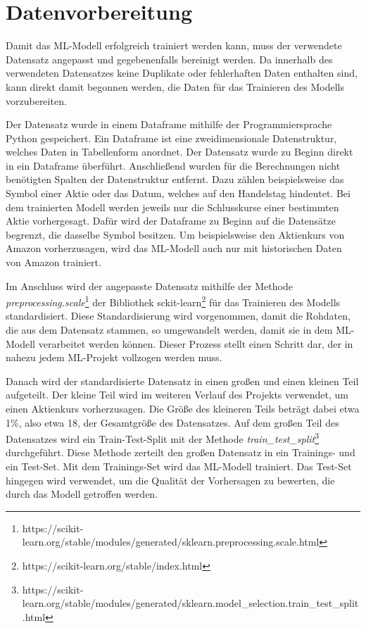 \chapter{Datenvorbereitung}\label{chp:datenvorbereitung}
Damit das ML-Modell erfolgreich trainiert werden kann, muss der verwendete Datensatz angepasst und gegebenenfalls bereinigt werden. Da innerhalb des verwendeten Datensatzes keine Duplikate oder fehlerhaften Daten enthalten sind, kann direkt damit begonnen werden, die Daten für das Trainieren des Modells vorzubereiten.

Der Datensatz wurde in einem Dataframe mithilfe der Programmiersprache Python gespeichert. Ein Dataframe ist eine zweidimensionale Datenstruktur, welches Daten in Tabellenform anordnet. Der Datensatz wurde zu Beginn direkt in ein Dataframe überführt. Anschließend wurden für die Berechnungen nicht benötigten Spalten der Datenstruktur entfernt. Dazu zählen beispielsweise das Symbol einer Aktie oder das Datum, welches auf den Handelstag hindeutet. Bei dem trainierten Modell werden jeweils nur die Schlusskurse einer bestimmten Aktie vorhergesagt. Dafür wird der Dataframe zu Beginn auf die Datensätze begrenzt, die dasselbe Symbol besitzen. Um beispielsweise den Aktienkurs von Amazon vorherzusagen, wird das ML-Modell auch nur mit historischen Daten von Amazon trainiert.

Im Anschluss wird der angepasste Datensatz mithilfe der Methode \textit{preprocessing.scale}\footnote{https://scikit-learn.org/stable/modules/generated/sklearn.preprocessing.scale.html} der Bibliothek sckit-learn\footnote{https://scikit-learn.org/stable/index.html} für das Trainieren des Modells standardisiert. Diese Standardisierung wird vorgenommen, damit die Rohdaten, die aus dem Datensatz stammen, so umgewandelt werden, damit sie in dem ML-Modell verarbeitet werden können. Dieser Prozess stellt einen Schritt dar, der in nahezu jedem ML-Projekt vollzogen werden muss.

Danach wird der standardisierte Datensatz in einen großen und einen kleinen Teil aufgeteilt. Der kleine Teil wird im weiteren Verlauf des Projekts verwendet, um einen Aktienkurs vorherzusagen. Die Größe des kleineren Teils beträgt dabei etwa 1\%, also etwa 18, der Gesamtgröße des Datensatzes. Auf dem großen Teil des Datensatzes wird ein Train-Test-Split mit der Methode \textit{train\_test\_split}\footnote{https://scikit-learn.org/stable/modules/generated/sklearn.model\_selection.train\_test\_split.html} durchgeführt. Diese Methode zerteilt den großen Datensatz in ein Trainings- und ein Test-Set. Mit dem Trainings-Set wird das ML-Modell trainiert. Das Test-Set hingegen wird verwendet, um die Qualität der Vorhersagen zu bewerten, die durch das Modell getroffen werden.